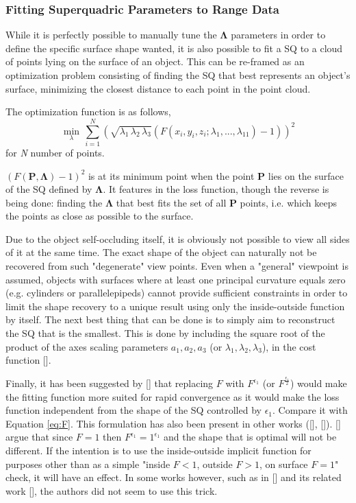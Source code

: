 \subsubsection{Fitting Superquadric Parameters to Range Data}

While it is perfectly possible to manually tune the $\mathbf{\Lambda}$ parameters in order to define the specific surface shape wanted, it is also possible to fit a \gls{SQ} to a cloud of points lying on the surface of an object. This can be re-framed as an optimization problem consisting of finding the \gls{SQ} that best represents an object's surface, minimizing the closest distance to each point in the point cloud.

The optimization function is as follows,
\begin{equation}
\min_{\lambda}\,\sum_{i=1}^N\left(\sqrt{\lambda_1\,\lambda_2\,\lambda_3}\left(F(x_i, y_i, z_i; \lambda_1, ..., \lambda_{11}) - 1\right)\right)^2
\label{eq:SQLoss}
\end{equation}
for \textit{N} number of points.

$\left( F( \textbf{P}, \mathbf{\Lambda}) - 1 \right)^2$ is at its minimum point when the point $\textbf{P}$	lies on the surface of the \gls{SQ} defined by $\mathbf{\Lambda}$. It features in the loss function, though the reverse is being done: finding the $\mathbf{\Lambda}$ that best fits the set of all $\textbf{P}$ points, i.e. which keeps the points as close as possible to the surface.

Due to the object self-occluding itself, it is obviously not possible to view all sides of it at the same time. The exact shape of the object can naturally not be recovered from such "degenerate" view points. Even when a "general" viewpoint is assumed, objects with surfaces where at least one principal curvature equals zero (e.g. cylinders or parallelepipeds) cannot provide sufficient constraints in order to limit the shape recovery to a unique result using only the inside-outside function by itself. The next best thing that can be done is to simply aim to reconstruct the \gls{SQ} that is the smallest. This is done by including the square root of the product of the axes scaling parameters $a_1, a_2, a_3$ (or $\lambda_1, \lambda_2, \lambda_3$), in the cost function [\citeauthor{Jaklic2000}].

Finally, it has been suggested by [\citeauthor{Jaklic2000}] that replacing $F$ with $F^{\epsilon_1}$ (or $F^{\frac{\epsilon_1}{2}}$)  would make the fitting function more suited for rapid convergence as it would make the loss function independent from the shape of the \gls{SQ} controlled by $\epsilon_1$. Compare it with Equation \ref{eq:F}. This formulation has also been present in other works ([\citeauthor{Tzovaras2007a}], [\citeauthor{Pascoal2015}]). [\citeauthor{Jaklic2000}] argue that since  $F = 1$ then $F^{\epsilon_1} = 1^{\epsilon_1}$ and the shape that is optimal will not be different. If the intention is to use the inside-outside implicit function for purposes other than as a simple "inside $F < 1$, outside $F > 1$, on surface $F = 1$" check, it will have an effect. In some works however, such as in [\citeauthor{Vezzani2018}] and its related work [\citeauthor{Fantacci2017}], the authors did not seem to use this trick.

